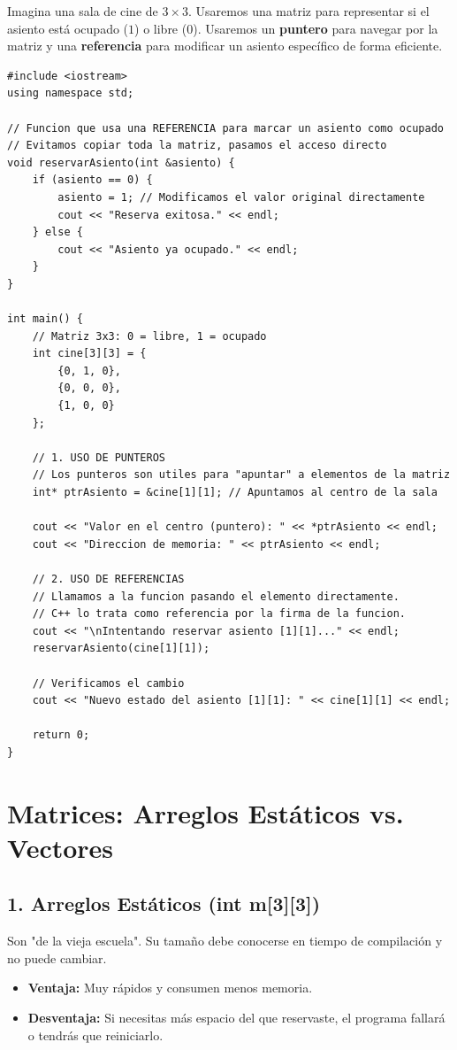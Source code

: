 \documentclass{article}
\begin{document}
Imagina una sala de cine de $3 \times 3$. Usaremos una matriz para representar si el asiento está ocupado ($1$) o libre ($0$). Usaremos un \textbf{puntero} para navegar por la matriz y una \textbf{referencia} para modificar un asiento específico de forma eficiente.

\begin{lstlisting}
#include <iostream>
using namespace std;

// Funcion que usa una REFERENCIA para marcar un asiento como ocupado
// Evitamos copiar toda la matriz, pasamos el acceso directo
void reservarAsiento(int &asiento) {
    if (asiento == 0) {
        asiento = 1; // Modificamos el valor original directamente
        cout << "Reserva exitosa." << endl;
    } else {
        cout << "Asiento ya ocupado." << endl;
    }
}

int main() {
    // Matriz 3x3: 0 = libre, 1 = ocupado
    int cine[3][3] = {
        {0, 1, 0},
        {0, 0, 0},
        {1, 0, 0}
    };

    // 1. USO DE PUNTEROS
    // Los punteros son utiles para "apuntar" a elementos de la matriz
    int* ptrAsiento = &cine[1][1]; // Apuntamos al centro de la sala

    cout << "Valor en el centro (puntero): " << *ptrAsiento << endl;
    cout << "Direccion de memoria: " << ptrAsiento << endl;

    // 2. USO DE REFERENCIAS
    // Llamamos a la funcion pasando el elemento directamente. 
    // C++ lo trata como referencia por la firma de la funcion.
    cout << "\nIntentando reservar asiento [1][1]..." << endl;
    reservarAsiento(cine[1][1]); 

    // Verificamos el cambio
    cout << "Nuevo estado del asiento [1][1]: " << cine[1][1] << endl;

    return 0;
}
\end{lstlisting}

\section{Matrices: Arreglos Estáticos vs. Vectores}

\subsection{1. Arreglos Estáticos (int m[3][3])}
Son "de la vieja escuela". Su tamaño debe conocerse en tiempo de compilación y no puede cambiar.
\begin{itemize}
    \item \textbf{Ventaja:} Muy rápidos y consumen menos memoria.
    \item \textbf{Desventaja:} Si necesitas más espacio del que reservaste, el programa fallará o tendrás que reiniciarlo.
\end{itemize}
\end{document}
